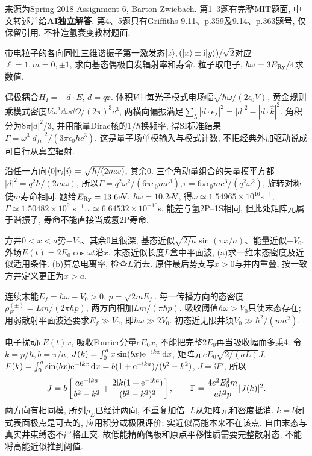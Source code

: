 来源为Spring 2018 Assignment 6, Barton Zwiebach. 第1--3题有完整MIT题面, 中文转述并给\textbf{AI独立解答}. 第4、5题只有Griffiths 9.11、p.359及9.14、p.363题号, 仅保留引用, 不补造氢衰变教材题面.
\begin{exercise}
带电粒子的各向同性三维谐振子第一激发态$\lvert z\rangle, (\lvert x\rangle\pm\mathrm i\lvert y\rangle)/\sqrt2$对应$\ell=1,m=0,\pm1$, 求向基态偶极自发辐射率和寿命. 粒子取电子, $\hbar\omega=3E_{\rm Ry}/4$求数值.
\end{exercise}
\begin{solution}
偶极耦合$H_I=-d\cdot E$, $d=q\boldsymbol r$. 体积$V$中每光子模式电场幅$\sqrt{\hbar\omega/(2\epsilon_0V)}$, 黄金规则乘模式密度$V\omega^2\dd\omega\dd\Omega/(2\pi)^3c^3$, 两横向偏振满足$\sum_\lambda|d\cdot\epsilon_\lambda|^2=|d|^2-|d\cdot\hat k|^2$. 角积分为$8\pi|d|^2/3$, 并用能量Dirac核的$1/\hbar$换频率, 得SI标准结果$\Gamma=\omega^3|d_{fi}|^2/(3\pi\epsilon_0\hbar c^3)$. 这是量子场单模输入与模式计数, 不把经典外加驱动说成可自行从真空辐射.

沿任一方向$\langle 0\rvert r_i\lvert i\rangle=\sqrt{\hbar/(2m\omega)}$, 其余0. 三个角动量组合的矢量模平方都$|d|^2=q^2\hbar/(2m\omega)$, 所以$\Gamma=q^2\omega^2/(6\pi\epsilon_0mc^3)$,$\tau=6\pi\epsilon_0mc^3/(q^2\omega^2)$, 旋转对称使$m$寿命相同. 题给$E_{\rm Ry}=13.6$eV, $\hbar\omega=10.2$eV, 得$\omega\simeq1.54965\times10^{16}$s$^{-1}$, $\Gamma\simeq1.50482\times10^9$ s$^{-1}$,$\tau\simeq6.64532\times10^{-10}$s. 能差与氢2P--1S相同, 但此处矩阵元属于谐振子, 寿命不能直接当成氢2P寿命.
\end{solution}
\begin{exercise}
方井$0<x<a$势$-V_0$、其余0且很深, 基态近似$\sqrt{2/a}\sin(\pi x/a)$、能量近似$-V_0$. 外场$E(t)=2E_0\cos\omega t$沿$x$. 末态近似长度$L$盒中平面波, (a)求一维末态密度及近似适用条件. (b)算总电离率, 检查$L$消去. 原件最后势支写$x>0$与井内重叠, 按一致方井定义更正为$x>a$.
\end{exercise}
\begin{solution}
连续末能$E_f=\hbar\omega-V_0>0$, $p=\sqrt{2mE_f}$. 每一传播方向的态密度$\rho_E^{(\pm)}=Lm/(2\pi\hbar p)$, 两方向相加$Lm/(\pi\hbar p)$. 吸收阈值$\hbar\omega>V_0$只使末态存在; 用弱散射平面波还要求$E_f\gg V_0$, 即$\hbar\omega\gg2V_0$. 初态近无限井须$V_0\gg\hbar^2/(ma^2)$.

电子扰动$eE(t)x$, 吸收Fourier分量$eE_0x$, 不能把完整$2E_0$再当吸收幅而多乘4. 令$k=p/\hbar,b=\pi/a$, $J(k)=\int_0^a x\sin(bx)\mathrm e^{-\mathrm i kx}\,\mathrm d x$, 矩阵元$eE_0\sqrt{2/(aL)}J$. $F(k)=\int_0^a\sin(bx)\mathrm e^{-\mathrm i kx}\,\mathrm d x=b(1+\mathrm e^{-\mathrm i ka})/(b^2-k^2)$, $J=\ii F'$, 所以
\[
J=b\left[\frac{a\mathrm e^{-\mathrm i ka}}{b^2-k^2}
+\frac{2\mathrm i k(1+\mathrm e^{-\mathrm i ka})}{(b^2-k^2)^2}\right],\qquad
\Gamma=\frac{4e^2E_0^2m}{a\hbar^2p}|J(k)|^2.
\]
两方向有相同模, 所列$\rho_E$已经计两向, 不重复加倍. $L$从矩阵元和密度抵消. $k=b$闭式表面极点是可去的, 应用积分或极限评价; 实近似高能本来不在该点. 自由末态与真实井束缚态不严格正交, 故低能精确偶极和原点平移性质需要完整散射态, 不能将高能近似推到阈值.
\end{solution}
